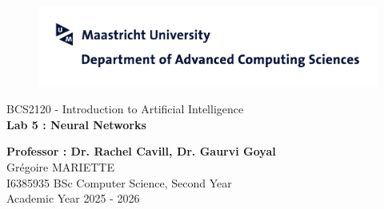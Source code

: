 \begin{titlepage}

\begin{figure}[h]
\centering
\includegraphics[scale=0.5]{TitlePage/img/bssc_dacs.jpg}
\end{figure}

\vspace{20mm}

\begin{center}

\begin{Large}
BCS2120 - Introduction to Artificial Intelligence\\
\vspace{2cm}
\textbf{Lab 5 :  Neural Networks} \\

\end{Large}


\vspace{90mm}
\textbf{Professor : Dr. Rachel Cavill, Dr. Gaurvi Goyal} \\


\vspace{20mm}
Grégoire MARIETTE\\
I6385935
BSc Computer Science, Second Year\\
\vspace{9mm}
Academic Year 2025 - 2026
\end{center}

\end{titlepage}